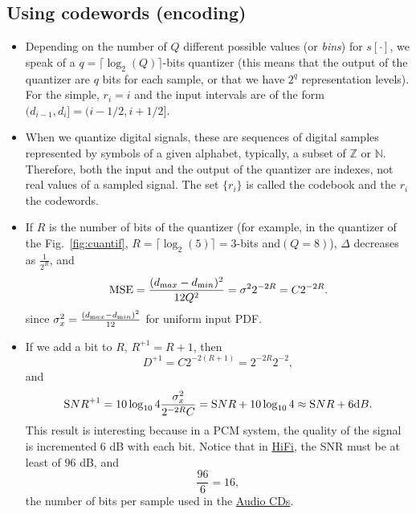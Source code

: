 \subsection{Using codewords (encoding)}
\begin{itemize}
  \tightlist
  
\item
  Depending on the number of \(Q\) different possible values (or
  \emph{bins}) for \(s[\cdot]\), we speak of a
  \(q=\lceil\log_2(Q)\rceil\)-bits quantizer (this means that the
  output of the quantizer are \(q\) bits for each sample, or that we
  have \(2^q\) representation levels). For the simple, $r_i=i$ and the
  input intervals are of the form $(d_{i-1},d_i]=(i-1/2,i+1/2]$.

\item
  When we quantize digital signals, these are sequences of digital
  samples represented by symbols of a given alphabet, typically, a
  subset of \({\mathbb{Z}}\) or \({\mathbb{N}}\). Therefore, both the
  input and the output of the quantizer are indexes, not real values
  of a sampled signal. The set $\{r_i\}$ is called the codebook and
  the $r_i$ the codewords.

\item If $R$ is the number of bits of the quantizer (for example, in
  the quantizer of the Fig.~\ref{fig:cuantif},
  $R=\lceil\log_2(5)\rceil=3$-bits and$(Q=8)$), $\Delta$ decreases as
  $\frac{1}{2^R}$, and
  \begin{equation}
    \text{MSE} = \frac{(d_{\text max}-d_{\text min})^2}{12Q^2} =
    \sigma^22^{-2R}=C2^{-2R}.
  \end{equation}
  since $\sigma^2_x=\frac{(d_{\text max}-d_{\text min})^2}{12}$ for
  uniform input PDF.

\item
  If we add a bit to $R$, $R^{+1}=R+1$, then
  \begin{equation*}
    D^{+1}=C2^{-2(R+1)} = 2^{-2R}2^{-2},
  \end{equation*}
  and
  \begin{equation*}
    {\text SNR}^{+1} = 10\log_{10}4\frac{\sigma_x^2}{2^{-2R}C} =
    {\text SNR} + 10\log_{10} 4 \approx {\text SNR} + 6 {\text dB}.
  \end{equation*}
  This result is interesting because in a PCM system, the quality of
  the signal is incremented $6$ dB with each bit. Notice that in
  \href{https://en.wikipedia.org/wiki/High_fidelity}{HiFi}, the SNR
  must be at least of $96$ dB, and
  \begin{equation*}
    \frac{96}{6} = 16,
  \end{equation*}
  the number of bits per sample used in the
  \href{https://en.wikipedia.org/wiki/Compact_disc}{Audio CDs}.
  
\end{itemize}

